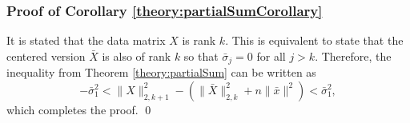 \documentclass[11pt]{article}
\begin{document}
\subsubsection*{Proof of Corollary \ref{theory:partialSumCorollary}}
It is stated that the data matrix $X$ is rank $k$. This is equivalent to state that the centered version $\bar{X}$ is also of rank $k$ so that $\bar{\sigma}_j = 0$ for all $j > k$. Therefore, the inequality from Theorem \ref{theory:partialSum} can be written as 
\begin{equation*}
	- \bar{\sigma}_1^2 < \|X\|_{2,k+1}^2 - 
	(\|\bar{X}\|_{2,k}^2 + n \|\bar{x}\|^2) < \bar{\sigma}_1^2,
\end{equation*}
which completes the proof. \qed 
\end{document}

